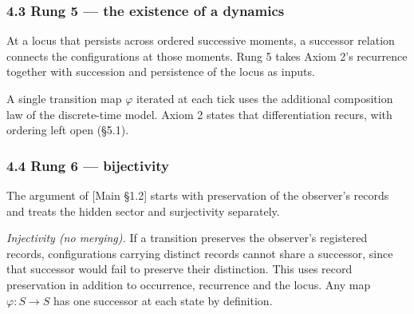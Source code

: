 \documentclass[
]{article}
\begin{document}
\hypertarget{rung-5-the-existence-of-a-dynamics}{%
\subsubsection{4.3 Rung 5 --- the existence of a
dynamics}\label{rung-5-the-existence-of-a-dynamics}}

At a locus that persists across ordered successive moments, a successor
relation connects the configurations at those moments. Rung 5 takes
Axiom 2's recurrence together with succession and persistence of the
locus as inputs.

A single transition map \(\varphi\) iterated at each tick uses the
additional composition law of the discrete-time model. Axiom 2 states
that differentiation recurs, with ordering left open (§5.1).

\hypertarget{rung-6-bijectivity}{%
\subsubsection{4.4 Rung 6 --- bijectivity}\label{rung-6-bijectivity}}

The argument of {[}Main §1.2{]} starts with preservation of the
observer's records and treats the hidden sector and surjectivity
separately.

\emph{Injectivity (no merging).} If a transition preserves the
observer's registered records, configurations carrying distinct records
cannot share a successor, since that successor would fail to preserve
their distinction. This uses record preservation in addition to
occurrence, recurrence and the locus. Any map \(\varphi: S \to S\) has
one successor at each state by definition.
\end{document}
